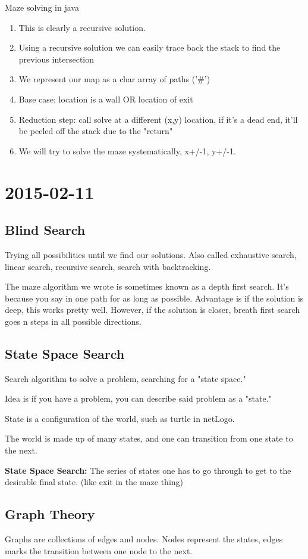 \documentclass [12 pt, twoside] {article}
\begin{document}
Maze solving in java
\begin{enumerate}
	\item This is clearly a recursive solution.
	\item Using a recursive solution we can easily trace back the stack to find the previous intersection
	\item We represent our map as a char array of paths ('\#')
	\item Base case: location is a wall OR location of exit
	\item Reduction step: call solve at a different (x,y) location, if it's a dead end, it'll be peeled off the stack due to the "return"
	\item We will try to solve the maze systematically, x+/-1, y+/-1.
\end{enumerate}

\section{2015-02-11}
\subsection{Blind Search}

Trying all possibilities until we find our solutions. Also called exhaustive search, linear search,
recursive search, search with backtracking.


The maze algorithm we wrote is sometimes known as a depth first search. It's because
you say in one path for as long as possible. Advantage is if the solution is deep, this works
pretty well. However, if the solution is closer, breath first search goes n steps in all
possible directions.

\subsection{State Space Search}

Search algorithm to solve a problem, searching for a "state space."

Idea is if you have a problem, you can describe said problem as a "state."

State is a configuration of the world, such as turtle in netLogo.

The world is made up of many states, and one can transition from one state to the next.

\textbf{State Space Search:} The series of states one has to go through to get to the desirable final state. (like exit in the maze thing)

\subsection{Graph Theory}

Graphs are collections of edges and nodes. Nodes represent the states, edges marks the transition between one node to the next.
\end{document}
